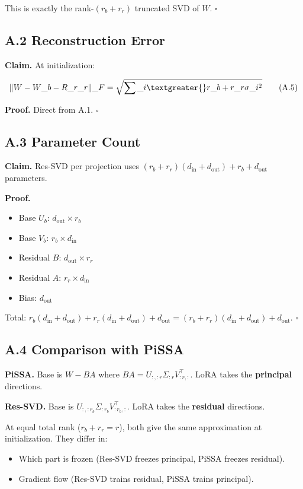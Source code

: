 This is exactly the rank-$(r_b + r_r)$ truncated SVD of $W$. $\square$

\subsection{A.2 Reconstruction Error}

\textbf{Claim.} At initialization:

\[
\|W - W\_b - R\_{r\_r}\|\_F = \sqrt{\sum\_{i \textgreater{} r\_b + r\_r} \sigma\_i^2}
\tag{A.5}
\]

\textbf{Proof.} Direct from A.1. $\square$

\subsection{A.3 Parameter Count}

\textbf{Claim.} Res-SVD per projection uses $(r_b + r_r)(d_\text{in} + d_\text{out}) + r_b + d_\text{out}$ 
parameters.

\textbf{Proof.}
\begin{itemize}
\item Base $U_b$: $d_\text{out} \times r_b$
\item Base $V_b$: $r_b \times d_\text{in}$
\item Residual $B$: $d_\text{out} \times r_r$
\item Residual $A$: $r_r \times d_\text{in}$
\item Bias: $d_\text{out}$

\end{itemize}
Total: $r_b(d_\text{in} + d_\text{out}) + r_r(d_\text{in} + d_\text{out}) + d_\text{out} = (r_b + r_r)(d_\text{in} + d_\text{out}) + d_\text{out}$. $\square$

\subsection{A.4 Comparison with PiSSA}

\textbf{PiSSA.} Base is $W - BA$ where $BA = U_{:, :r} \Sigma_{:r} V_{:r, :}^\top$. 
LoRA takes the \textbf{principal} directions.

\textbf{Res-SVD.} Base is $U_{:, :r_b} \Sigma_{:r_b} V_{:r_b, :}^\top$. LoRA 
takes the \textbf{residual} directions.

At equal total rank ($r_b + r_r = r$), both give the same approximation 
at initialization. They differ in:
\begin{itemize}
\item Which part is frozen (Res-SVD freezes principal, PiSSA freezes residual).
\item Gradient flow (Res-SVD trains residual, PiSSA trains principal).

\end{itemize}
